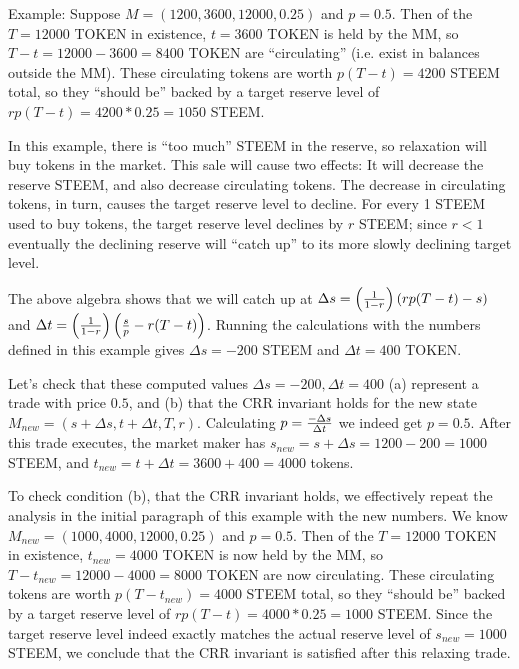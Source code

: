 \documentclass{article}
\begin{document}
Example:  Suppose $M = (1200, 3600, 12000, 0.25)$ and $p = 0.5$.  Then of the
$T = 12000$ TOKEN in existence, $t = 3600$ TOKEN is held by the MM, so
$T-t = 12000 - 3600 = 8400$ TOKEN are ``circulating'' (i.e. exist in balances
outside the MM).  These circulating tokens are worth $p(T-t) = 4200$ STEEM
total, so they ``should be'' backed by a target reserve level of
$rp(T-t) = 4200 * 0.25 = 1050$ STEEM.

In this example, there is ``too much'' STEEM in the reserve, so relaxation
will buy tokens in the market.  This sale will cause two effects:   It will
decrease the reserve STEEM, and also decrease circulating tokens.  The decrease
in circulating tokens, in turn, causes the target reserve level to decline.  For
every 1 STEEM used to buy tokens, the target reserve level declines by $r$ STEEM;
since $r < 1$ eventually the declining reserve will ``catch up'' to its more slowly
declining target level.

The above algebra shows that we will catch up at
$\Delta s = \left( {1 \over 1-r} \right) \left( r p (T - t) - s \right)$ and
$\Delta t = \left( {1 \over 1-r} \right) \left( {s \over p} - r (T - t) \right)$.
Running the calculations with the numbers defined in this example gives
$\Delta s = -200$ STEEM and $\Delta t = 400$ TOKEN.

Let's check that these computed values $\Delta s = -200, \Delta t = 400$
(a) represent a trade with price $0.5$, and (b) that the CRR invariant holds
for the new state $M_{new} = (s+\Delta s, t+\Delta t, T, r)$.  Calculating
$p = {- \Delta s \over \Delta t}$ we indeed get $p = 0.5$.  After this trade executes,
the market maker has $s_{new} = s + \Delta s = 1200 - 200 = 1000$ STEEM, and
$t_{new} = t + \Delta t = 3600 + 400 = 4000$ tokens.

To check condition (b), that the CRR invariant holds, we effectively repeat the
analysis in the initial paragraph of this example with the new numbers.  We know
$M_{new} = (1000, 4000, 12000, 0.25)$ and $p = 0.5$.  Then of the $T = 12000$
TOKEN in existence, $t_{new} = 4000$ TOKEN is now held by the MM, so
$T-t_{new} = 12000 - 4000 = 8000$ TOKEN are now circulating.  These circulating
tokens are worth $p(T-t_{new}) = 4000$ STEEM total, so they ``should be'' backed
by a target reserve level of $rp(T-t) = 4000 * 0.25 = 1000$ STEEM.  Since the
target reserve level indeed exactly matches the actual reserve level of
$s_{new} = 1000$ STEEM, we conclude that the CRR invariant is satisfied after
this relaxing trade.
\end{document}
